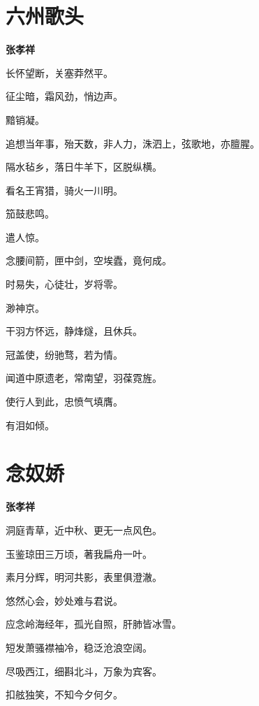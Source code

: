 \documentclass[12pt,a4paper]{ctexbook}
\begin{document}
\section{六州歌头}
\textbf{张孝祥}\par\vspace{0.5em}
长怀望断，关塞莽然平。\par
征尘暗，霜风劲，悄边声。\par
黯销凝。\par
追想当年事，殆天数，非人力，洙泗上，弦歌地，亦膻腥。\par
隔水毡乡，落日牛羊下，区脱纵横。\par
看名王宵猎，骑火一川明。\par
笳鼓悲鸣。\par
遣人惊。\par
念腰间箭，匣中剑，空埃蠹，竟何成。\par
时易失，心徒壮，岁将零。\par
渺神京。\par
干羽方怀远，静烽燧，且休兵。\par
冠盖使，纷驰骛，若为情。\par
闻道中原遗老，常南望，羽葆霓旌。\par
使行人到此，忠愤气填膺。\par
有泪如倾。\par

\section{念奴娇}
\textbf{张孝祥}\par\vspace{0.5em}
洞庭青草，近中秋、更无一点风色。\par
玉鉴琼田三万顷，著我扁舟一叶。\par
素月分辉，明河共影，表里俱澄澈。\par
悠然心会，妙处难与君说。\par
应念岭海经年，孤光自照，肝肺皆冰雪。\par
短发萧骚襟袖冷，稳泛沧浪空阔。\par
尽吸西江，细斟北斗，万象为宾客。\par
扣舷独笑，不知今夕何夕。\par
\end{document}
